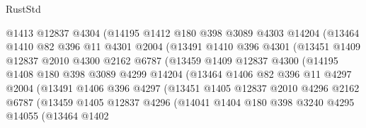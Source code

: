 \begin{lexlean}{RustStd}
\begin{coremodule}
                    @1413
                    @12837
                    @4304
                    (@14195
                      @1412
                      @180
                      @398
                      @3089
                      @4303
                      @14204
                      (@13464
                        @1410
                        @82
                        @396
                        @11
                        @4301
                        @2004
                        (@13491
                          @1410
                          @396
                          @4301
                          (@13451
                            @1409
                            @12837
                            @2010
                            @4300
                            @2162
                            @6787
                            (@13459
                              @1409
                              @12837
                              @4300
                              (@14195
                                @1408
                                @180
                                @398
                                @3089
                                @4299
                                @14204
                                (@13464
                                  @1406
                                  @82
                                  @396
                                  @11
                                  @4297
                                  @2004
                                  (@13491
                                    @1406
                                    @396
                                    @4297
                                    (@13451
                                      @1405
                                      @12837
                                      @2010
                                      @4296
                                      @2162
                                      @6787
                                      (@13459
                                        @1405
                                        @12837
                                        @4296
                                        (@14041
                                          @1404
                                          @180
                                          @398
                                          @3240
                                          @4295
                                          @14055
                                          (@13464
                                            @1402

\end{coremodule}
\end{lexlean}
